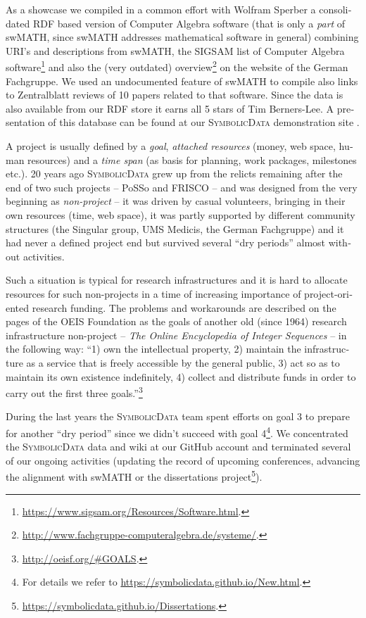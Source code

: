 \documentclass[11pt]{article}
\def\SD{\textsc{SymbolicData}}
\begin{document}
\begin{otherlanguage}{english}
\begin{multicols}{2}
As a showcase we compiled in a common effort with Wolfram Sperber a
consolidated RDF based version of Computer Algebra software (that is only a
\emph{part} of swMATH, since swMATH addresses mathematical software in
general) combining URI's and descriptions from swMATH, the SIGSAM list of
Computer Algebra
software\footnote{\url{https://www.sigsam.org/Resources/Software.html}.} and
also the (very outdated)
overview\footnote{\url{http://www.fachgruppe-computeralgebra.de/systeme/}.} on
the website of the German Fachgruppe.  We used an undocumented feature of
swMATH to compile also links to Zentralblatt reviews of 10 papers related to
that software.  Since the data is also available from our RDF store it earns
all 5 stars of Tim Berners-Lee.  A presentation of this database can be found
at our {\SD} demonstration site \cite{sdinfo}.

\Ueberschrift{{\SD} as Non-Project}{sec7}

A project is usually defined by a \emph{goal}, \emph{attached resources}
(money, web space, human resources) and a \emph{time span} (as basis for
planning, work packages, milestones etc.).  20 years ago {\SD} grew up from
the relicts remaining after the end of two such projects -- PoSSo and FRISCO
-- and was designed from the very beginning as \emph{non-project} -- it was
driven by casual volunteers, bringing in their own resources (time, web
space), it was partly supported by different community structures (the
Singular group, UMS Medicis, the German Fachgruppe) and it had never a defined
project end but survived several ``dry periods'' almost without activities.

Such a situation is typical for research infrastructures and it is hard to
allocate resources for such non-projects in a time of increasing importance of
project-oriented research funding.  The problems and workarounds are described
on the pages of the OEIS Foundation as the goals of another old (since 1964)
research infrastructure non-project -- \emph{The Online Encyclopedia of Integer
  Sequences} -- in the following way: ``1) own the intellectual property, 2)
maintain the infrastructure as a service that is freely accessible by the
general public, 3) act so as to maintain its own existence indefinitely, 4)
collect and distribute funds in order to carry out the first three
goals.''\footnote{\url{http://oeisf.org/\#GOALS}.}

During the last years the {\SD} team spent efforts on goal 3 to prepare for
another ``dry period'' since we didn't succeed with goal 4\footnote{For details
  we refer to \url{https://symbolicdata.github.io/New.html}.}.  We concentrated
the {\SD} data and wiki at our GitHub account and terminated several of our
ongoing activities (updating the record of upcoming conferences, advancing the
alignment with swMATH or the dissertations
project\footnote{\url{https://symbolicdata.github.io/Dissertations}.}).


\end{multicols}
\end{otherlanguage}
\end{document}
